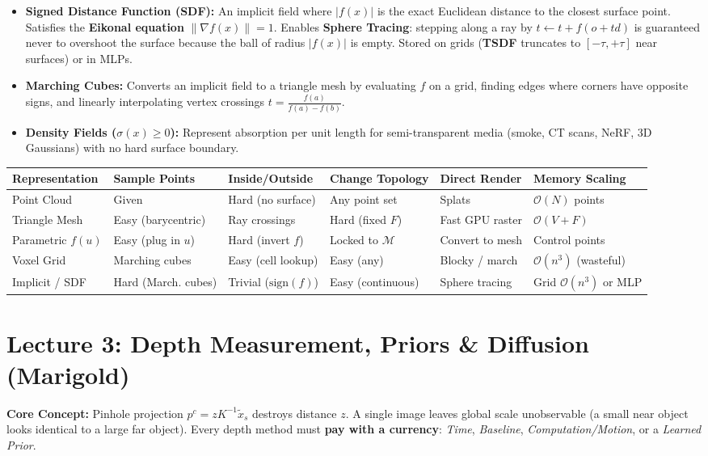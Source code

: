 \documentclass[11pt,a4paper]{article}
\theoremstyle{definition}
\theoremstyle{plain}
\theoremstyle{remark}
\begin{document}
\begin{itemize}
\begin{itemize}
        \item \textbf{Signed Distance Function (SDF):} An implicit field where $|f(x)|$ is the exact Euclidean distance to the closest surface point. Satisfies the \textbf{Eikonal equation} $\|\nabla f(x)\| = 1$. Enables \textbf{Sphere Tracing}: stepping along a ray by $t \leftarrow t + f(o+td)$ is guaranteed never to overshoot the surface because the ball of radius $|f(x)|$ is empty. Stored on grids (\textbf{TSDF} truncates to $[-\tau, +\tau]$ near surfaces) or in MLPs.
        \item \textbf{Marching Cubes:} Converts an implicit field to a triangle mesh by evaluating $f$ on a grid, finding edges where corners have opposite signs, and linearly interpolating vertex crossings $t = \frac{f(a)}{f(a)-f(b)}$.
        \item \textbf{Density Fields ($\sigma(x) \ge 0$):} Represent absorption per unit length for semi-transparent media (smoke, CT scans, NeRF, 3D Gaussians) with no hard surface boundary.
    \end{itemize}
\end{itemize}

\begin{table}[h!]
\centering
\small
{}
\begin{tabularx}{\textwidth}{l Y Y Y Y Y}
\toprule
\textbf{Representation} & \textbf{Sample Points} & \textbf{Inside/Outside} & \textbf{Change Topology} & \textbf{Direct Render} & \textbf{Memory Scaling} \\
\midrule
Point Cloud & Given & Hard (no surface) & Any point set & Splats & $\mathcal{O}(N)$ points \\
Triangle Mesh & Easy (barycentric) & Ray crossings & Hard (fixed $F$) & Fast GPU raster & $\mathcal{O}(V + F)$ \\
Parametric $f(u)$ & Easy (plug in $u$) & Hard (invert $f$) & Locked to $\mathcal{M}$ & Convert to mesh & Control points \\
Voxel Grid & Marching cubes & Easy (cell lookup) & Easy (any) & Blocky / march & $\mathcal{O}(n^3)$ (wasteful) \\
Implicit / SDF & Hard (March. cubes) & Trivial ($\text{sign}(f)$) & Easy (continuous) & Sphere tracing & Grid $\mathcal{O}(n^3)$ or MLP \\
\bottomrule
\end{tabularx}
\end{table}

\hr
\section*{\textcolor{primary}{Lecture 3: Depth Measurement, Priors \& Diffusion (Marigold)}}
\textbf{Core Concept:} Pinhole projection $p^c = z K^{-1}\tilde{x}_s$ destroys distance $z$. A single image leaves global scale unobservable (a small near object looks identical to a large far object). Every depth method must \textbf{pay with a currency}: \emph{Time}, \emph{Baseline}, \emph{Computation/Motion}, or a \emph{Learned Prior}.
\end{document}
